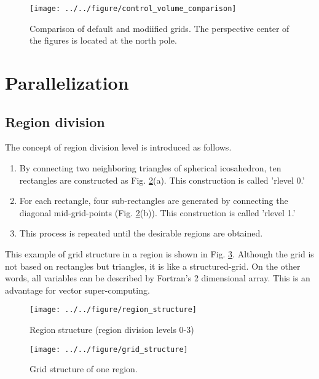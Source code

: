 \begin{figure}[H]
  \begin{center}
    \texttt{[image: ../../figure/control\_volume\_comparison]}
    \caption{Comparison of default and modiified grids. The perspective
      center of the figures is located at the north pole.}
    \label{fig:scale-gm_control_volume_comparison}
  \end{center}
\end{figure}



\section{Parallelization}
\subsection{Region division}
The concept of region division level is introduced as follows.
\begin{enumerate}
  \item By connecting two neighboring triangles of spherical icosahedron, ten
    rectangles are constructed as Fig. \ref{fig:scale-gm_region_structure}(a). This construction is called 'rlevel
    0.'
  \item For each rectangle, four sub-rectangles are generated by connecting
    the diagonal mid-grid-points (Fig. \ref{fig:scale-gm_region_structure}(b)). This construction is called
    'rlevel 1.'
  \item This process is repeated until the desirable regions are obtained.
\end{enumerate}
This example of grid structure in a region is shown in Fig. \ref{fig:scale-gm_grid_structure}. Although the
grid is not based on rectangles but triangles, it is like a
structured-grid. On the other words, all variables can be described by
Fortran's 2 dimensional array. This is an advantage for vector super-computing.

\begin{figure}[H]
  \begin{center}
    \texttt{[image: ../../figure/region\_structure]}
    \caption{Region structure (region division levels 0-3)}
    \label{fig:scale-gm_region_structure}
  \end{center}
\end{figure}

\begin{figure}[H]
  \begin{center}
    \texttt{[image: ../../figure/grid\_structure]}
    \caption{Grid structure of one region.}
    \label{fig:scale-gm_grid_structure}
  \end{center}
\end{figure}


